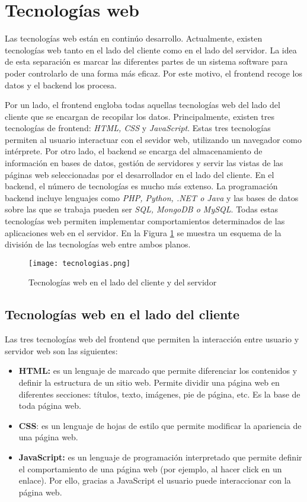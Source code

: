 \section{Tecnologías web}
Las tecnologías web están en continúo desarrollo. Actualmente, existen tecnologías web tanto en el lado del cliente como en el lado del servidor. La idea de esta separación es marcar las diferentes partes de un sistema software para poder controlarlo de una forma más eficaz. Por este motivo, el frontend recoge los datos y el backend los procesa. \newline


Por un lado, el frontend engloba todas aquellas tecnologías web del lado del cliente que se encargan de recopilar los datos. Principalmente, existen tres tecnologías de frontend: \textit{HTML, CSS} y \textit{JavaScript}. Estas tres tecnologías permiten al usuario interactuar con el sevidor web, utilizando un navegador como intérprete. Por otro lado, el backend se encarga del almacenamiento de información en bases de datos, gestión de servidores y servir las vistas de las páginas web seleccionadas por el desarrollador en el lado del cliente. En el backend, el número de tecnologías es mucho más extenso. La programación backend incluye lenguajes como \textit{PHP, Python, .NET o Java }y las bases de datos sobre las que se trabaja pueden ser \textit{SQL, MongoDB o MySQL}. Todas estas tecnologías web permiten implementar comportamientos determinados de las aplicaciones web en el servidor. En la Figura \ref{fig:tecnologias} se muestra un esquema de la división de las tecnologías web entre ambos planos. \newline

\begin{figure}[h!]
    \centering
    \texttt{[image: tecnologias.png]}
    \caption{Tecnologías web en el lado del cliente y del servidor \footnotemark}
    \label{fig:tecnologias}
\end{figure}
  
\subsection{Tecnologías web en el lado del cliente}
Las tres tecnologías web del frontend que permiten la interacción entre usuario y servidor web son las siguientes:
\begin{itemize}
    \item \textbf{HTML:} es un lenguaje de marcado que permite diferenciar los contenidos y definir la estructura de un sitio web. Permite dividir una página web en diferentes secciones: títulos, texto, imágenes, pie de página, etc. Es la base de toda página web.
    \item \textbf{CSS}: es un lenguaje de hojas de estilo que permite modificar la apariencia de una página web.
    \item \textbf{JavaScript:} es un lenguaje de programación interpretado que permite definir el comportamiento de una página web (por ejemplo, al hacer click en un enlace). Por ello, gracias a JavaScript el usuario puede interaccionar con la página web.
\end{itemize}

